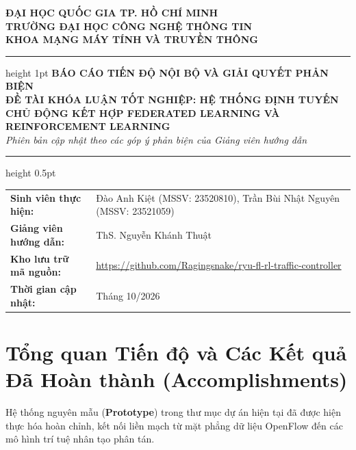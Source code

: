 \documentclass[11pt,a4paper]{article}
\begin{document}

\begin{center}
    {\large\bfseries ĐẠI HỌC QUỐC GIA TP. HỒ CHÍ MINH}\\
    {\large\bfseries TRƯỜNG ĐẠI HỌC CÔNG NGHỆ THÔNG TIN}\\
    {\normalsize\bfseries KHOA MẠNG MÁY TÍNH VÀ TRUYỀN THÔNG}\\
    \vspace{0.4cm}
    \hrule height 1pt
    \vspace{0.4cm}
    {\Large\bfseries BÁO CÁO TIẾN ĐỘ NỘI BỘ VÀ GIẢI QUYẾT PHẢN BIỆN}\\
    {\large\bfseries ĐỀ TÀI KHÓA LUẬN TỐT NGHIỆP: HỆ THỐNG ĐỊNH TUYẾN CHỦ ĐỘNG KẾT HỢP FEDERATED LEARNING VÀ REINFORCEMENT LEARNING}\\[0.2cm]
    \textit{Phiên bản cập nhật theo các góp ý phản biện của Giảng viên hướng dẫn}
    \vspace{0.3cm}
    \hrule height 0.5pt
\end{center}

\vspace{0.2cm}
\noindent\begin{tabularx}{\textwidth}{@{}lX@{}}
\textbf{Sinh viên thực hiện:} & Đào Anh Kiệt (MSSV: 23520810), Trần Bùi Nhật Nguyên (MSSV: 23521059)\\
\textbf{Giảng viên hướng dẫn:} & ThS. Nguyễn Khánh Thuật\\
\textbf{Kho lưu trữ mã nguồn:} & {\small\url{https://github.com/Ragingsnake/ryu-fl-rl-traffic-controller}}\\
\textbf{Thời gian cập nhật:} & Tháng 10/2026\\
\end{tabularx}

\vspace{0.3cm}

\section{Tổng quan Tiến độ và Các Kết quả Đã Hoàn thành (Accomplishments)}

Hệ thống nguyên mẫu (\textbf{Prototype}) trong thư mục dự án hiện tại đã được hiện thực hóa hoàn chỉnh, kết nối liền mạch từ mặt phẳng dữ liệu OpenFlow đến các mô hình trí tuệ nhân tạo phân tán.
\end{document}
